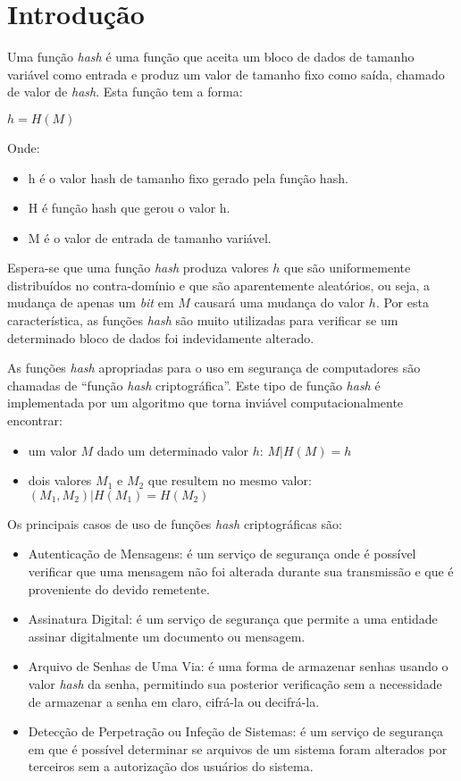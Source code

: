 \section{Introdução}\label{sec:firstpage}

Uma função \textit{hash} é uma função que aceita um bloco de dados de tamanho
variável como entrada e produz um valor de tamanho fixo como saída, chamado de
valor de \textit{hash}. Esta função tem a forma:
\begin{center}
    $h = H(M)$
\end{center}

Onde:
\begin{itemize}
	\item h é o valor hash de tamanho fixo gerado pela função hash.
	\item H é função hash que gerou o valor h.
	\item M é o valor de entrada de tamanho variável.
\end{itemize}

Espera-se que uma função \textit{hash} produza valores $h$ que são
uniformemente distribuídos no contra-domínio e que são aparentemente
aleatórios, ou seja, a mudança de apenas um \textit{bit} em $M$ causará uma
mudança do valor $h$. Por esta característica, as funções \textit{hash} são
muito utilizadas para verificar se um determinado bloco de dados foi
indevidamente alterado.

As funções \textit{hash} apropriadas para o uso em segurança de computadores
são chamadas de ``função \textit{hash} criptográfica''. Este tipo de função
\textit{hash} é implementada por um algoritmo que torna inviável
computacionalmente encontrar:
\begin{itemize}
    \item um valor $M$ dado um determinado valor $h$:
        $M | H(M) = h$
    \item dois valores $M_1$ e $M_2$ que resultem no mesmo valor:
        $(M_1, M_2) | H(M_1) = H(M_2)$
\end{itemize}

Os principais casos de uso de funções \textit{hash} criptográficas são:
\begin{itemize}
    \item Autenticação de Mensagens: é um serviço de segurança onde é possível
        verificar que uma mensagem não foi alterada durante sua transmissão e
        que é proveniente do devido remetente.
    \item Assinatura Digital: é um serviço de segurança que permite a uma
        entidade assinar digitalmente um documento ou mensagem.
    \item Arquivo de Senhas de Uma Via: é uma forma de armazenar senhas usando
        o valor \textit{hash} da senha, permitindo sua posterior verificação
        sem a necessidade de armazenar a senha em claro, cifrá-la ou
        decifrá-la.
    \item Detecção de Perpetração ou Infeção de Sistemas: é um serviço de
        segurança em que é possível determinar se arquivos de um sistema foram
        alterados por terceiros sem a autorização dos usuários do sistema.
\end{itemize}

